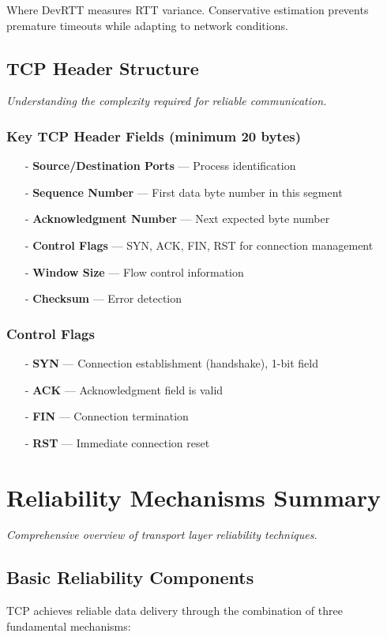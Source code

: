 \documentclass[../../compsys.tex]{subfiles}
\begin{document}
Where DevRTT measures RTT variance. Conservative estimation prevents premature timeouts while adapting to network conditions.

\subsection{TCP Header Structure}
\textit{Understanding the complexity required for reliable communication.}

\subsubsection{Key TCP Header Fields (minimum 20 bytes)}
\begin{itemize}
  \item[-] \textbf{Source/Destination Ports} — Process identification
  \item[-] \textbf{Sequence Number} — First data byte number in this segment
  \item[-] \textbf{Acknowledgment Number} — Next expected byte number
  \item[-] \textbf{Control Flags} — SYN, ACK, FIN, RST for connection management
  \item[-] \textbf{Window Size} — Flow control information
  \item[-] \textbf{Checksum} — Error detection
\end{itemize}

\subsubsection{Control Flags}
\begin{itemize}
  \item[-] \textbf{SYN} — Connection establishment (handshake), 1-bit field
  \item[-] \textbf{ACK} — Acknowledgment field is valid
  \item[-] \textbf{FIN} — Connection termination
  \item[-] \textbf{RST} — Immediate connection reset
\end{itemize}

\section{Reliability Mechanisms Summary}
\textit{Comprehensive overview of transport layer reliability techniques.}

\subsection{Basic Reliability Components}
TCP achieves reliable data delivery through the combination of three fundamental mechanisms:
\end{document}
